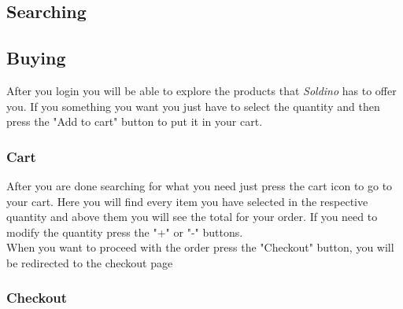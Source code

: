 	\subsection{Searching}
	\subsection{Buying}
	After you login you will be able to explore the products that 
	\textit{Soldino} has to offer you. If you something you want you
	just have to select the quantity and then press the "Add to cart" button 
	to put it in your cart.
	\subsubsection{Cart}
	After you are done searching for what you need just press the cart icon to
	go to your cart. Here you will find every item you have selected in the 
	respective quantity and above them you will see the total for your order.
	If you need to modify the quantity press the "+" or "-" buttons. \\
	When you want to proceed with the order press the "Checkout" button, 
	you will be redirected to the checkout page
	\subsubsection{Checkout}
